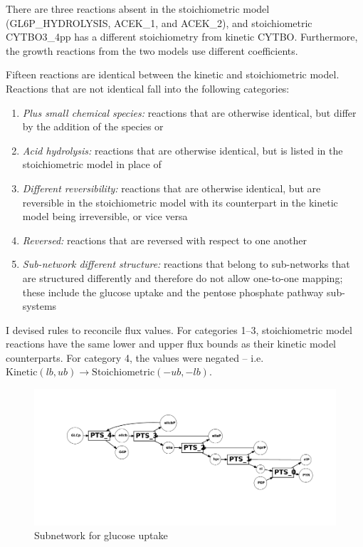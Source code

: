 \documentclass[parskip=full, numbers=noenddot]{scrreprt}
\begin{document}
There are three reactions absent in the stoichiometric model (GL6P\_HYDROLYSIS, ACEK\_1, and ACEK\_2), and stoichiometric CYTBO3\_4pp has a different stoichiometry from kinetic CYTBO. Furthermore, the growth reactions from the two models use different coefficients.

Fifteen reactions are identical between the kinetic and stoichiometric model. Reactions that are not identical fall into the following categories:

\begin{enumerate}
\item \emph{Plus small chemical species:} reactions that are otherwise identical, but differ by the addition of the species  or 
\item \emph{Acid hydrolysis:} reactions that are otherwise identical, but  is listed in the stoichiometric model in place of 
\item \emph{Different reversibility:} reactions that are otherwise identical, but are reversible in the stoichiometric model with its counterpart in the kinetic model being irreversible, or vice versa
\item \emph{Reversed:} reactions that are reversed with respect to one another
  \item \emph{Sub-network different structure:} reactions that belong to sub-networks that are structured differently and therefore do not allow one-to-one mapping; these include the glucose uptake and the pentose phosphate pathway sub-systems
  \end{enumerate}

I devised rules to reconcile flux values. For categories 1--3, stoichiometric model reactions have the same lower and upper flux bounds as their kinetic model counterparts. For category 4, the values were negated -- i.e. $ \mathrm{Kinetic } (lb, ub) \rightarrow \mathrm{Stoichiometric } (-ub, -lb)$. %

\begin{figure}[p]
  \centering
  \includegraphics[scale=0.4]{glucoseuptake}
  \caption{Subnetwork for glucose uptake}
  \label{fig:glucoseuptake}
\end{figure}
\end{document}
